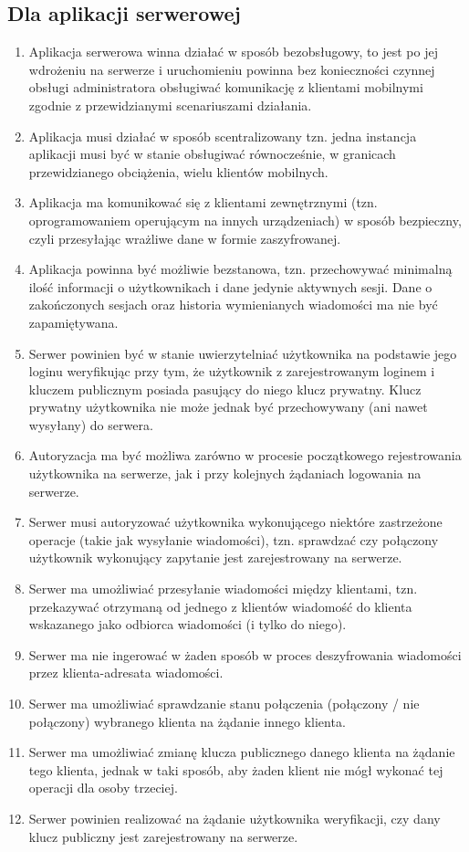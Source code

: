 \documentclass[../main.tex]{subfiles}
\begin{document}
\subsection{Dla aplikacji serwerowej}\label{sec:backend_application_requirements}
\begin{enumerate}
	\item Aplikacja serwerowa winna działać w sposób bezobsługowy, to jest po jej wdrożeniu na serwerze i uruchomieniu powinna bez konieczności czynnej obsługi administratora obsługiwać komunikację z klientami mobilnymi zgodnie z przewidzianymi scenariuszami działania.
	\item Aplikacja musi działać w sposób scentralizowany tzn. jedna instancja aplikacji musi być w stanie obsługiwać równocześnie, w granicach przewidzianego obciążenia, wielu klientów mobilnych.
	\item Aplikacja ma komunikować się z klientami zewnętrznymi (tzn. oprogramowaniem operującym na innych urządzeniach) w sposób bezpieczny, czyli przesyłając wrażliwe dane w formie zaszyfrowanej.
	\item Aplikacja powinna być możliwie bezstanowa, tzn. przechowywać minimalną ilość informacji o użytkownikach i dane jedynie aktywnych sesji. Dane o zakończonych sesjach oraz historia wymienianych wiadomości ma nie być zapamiętywana.
	\item Serwer powinien być w stanie uwierzytelniać użytkownika na podstawie jego loginu weryfikując przy tym, że użytkownik z zarejestrowanym loginem i kluczem publicznym posiada pasujący do niego klucz prywatny. Klucz prywatny użytkownika nie może jednak być przechowywany (ani nawet wysyłany) do serwera.
	\item Autoryzacja ma być możliwa zarówno w procesie początkowego rejestrowania użytkownika na serwerze, jak i przy kolejnych żądaniach logowania na serwerze.
	\item Serwer musi autoryzować użytkownika wykonującego niektóre zastrzeżone operacje (takie jak wysyłanie wiadomości), tzn. sprawdzać czy połączony użytkownik wykonujący zapytanie jest zarejestrowany na serwerze.
	\item Serwer ma umożliwiać przesyłanie wiadomości między klientami, tzn. przekazywać otrzymaną od jednego z klientów wiadomość do klienta wskazanego jako odbiorca wiadomości (i tylko do niego).
	\item Serwer ma nie ingerować w żaden sposób w proces deszyfrowania wiadomości przez klienta-adresata wiadomości.
	\item Serwer ma umożliwiać sprawdzanie stanu połączenia (połączony / nie połączony) wybranego klienta na żądanie innego klienta.
	\item Serwer ma umożliwiać zmianę klucza publicznego danego klienta na żądanie tego klienta, jednak w taki sposób, aby żaden klient nie mógł wykonać tej operacji dla osoby trzeciej.
	\item Serwer powinien realizować na żądanie użytkownika weryfikacji, czy dany klucz publiczny jest zarejestrowany na serwerze.
\end{enumerate}
\end{document}
